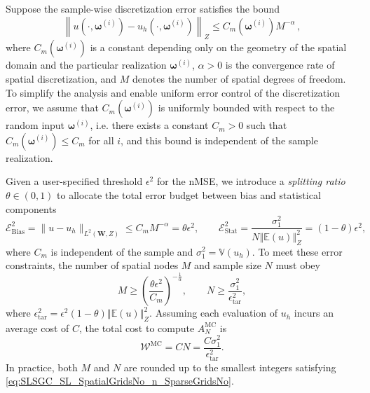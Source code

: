 %
Suppose the sample-wise discretization error satisfies the bound
%
\begin{equation*} \label{eq:Assumption_uhA}
\left\|u\left(\cdot, \boldsymbol\omega^{(i)}\right)-u_h\left(\cdot,\boldsymbol\omega^{(i)}\right)\right\|_Z\leq C_m\left(\boldsymbol\omega^{(i)}\right)M^{-\alpha}\,,
\end{equation*}
%
where $C_m(\boldsymbol\omega^{(i)})$ is a constant depending only on the geometry of the spatial domain and the particular realization $\boldsymbol\omega^{(i)}$, $\alpha>0$ is the convergence rate of spatial discretization, and $M$ denotes the number of spatial degrees of freedom. To simplify the analysis and enable uniform error control of the discretization error, we assume that $C_m(\boldsymbol\omega^{(i)})$ is uniformly bounded with respect to the random input $\boldsymbol\omega^{(i)}$, i.e. there exists a constant $C_m>0$ such that $C_m(\boldsymbol\omega^{(i)})\le C_m$ for all $i$, and this bound is independent of the sample realization.

Given a user-specified threshold $\epsilon^2$  for the nMSE, we introduce a {\it splitting ratio} $\theta \in (0,1)$ to allocate the total error budget between bias and statistical components
%
\begin{equation} \label{eq:error-budget}
\mathcal{E}_{\text{Bias}}^2=\|u-u_h\|_{L^2(\boldsymbol W,Z)}\le C_mM^{-\alpha}= \theta\epsilon^2, \quad\quad \mathcal{E}_{\text{Stat}}^2 = \frac{\sigma_1^2}{N\left\Vert\mathbb{E}(u) \right\Vert_{Z}^2}=(1-\theta)\epsilon^2,
\end{equation}
where $C_m$ is independent of the sample and $\sigma_1^2 = \mathbb{V}\left( u_{h}\right)$. To meet these error constraints, the number of spatial nodes $M$ and sample size $N$ must obey
%
\begin{equation}
\label{eq:SLSGC_SL_SpatialGridsNo_n_SparseGridsNo}
M\ge \left(\frac{\theta\epsilon^2}{C_m}\right)^{-\frac 1 {\alpha}},\quad\quad  N \ge  \frac{\sigma_1^2}{\epsilon_{\text{tar}}^2},
\end{equation}
%
where $\epsilon_{\text{tar}}^2 = \epsilon^2(1-\theta)\left\Vert\mathbb{E}(u) \right\Vert_{Z}^2$.
Assuming each evaluation of $u_{h}$ incurs an average cost of $C$, the total cost to compute $A^{\text{MC}}_{N}$ is
%
\[
\mathcal{W}^\text{MC}  = CN=\frac{C\sigma_1^2}{\epsilon_{\text{tar}}^2}.
\]
%
In practice, both $M$ and $N$ are rounded up to the smallest integers satisfying \eqref{eq:SLSGC_SL_SpatialGridsNo_n_SparseGridsNo}.
